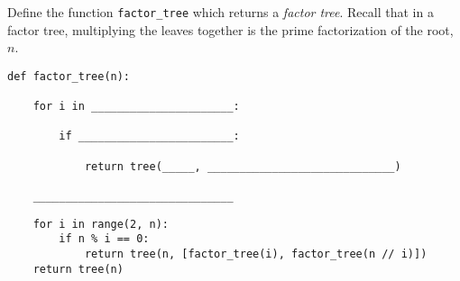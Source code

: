 \begin{blocksection}
\question Define the function \lstinline$factor_tree$ which returns a \emph{factor tree}. Recall that in a factor tree, multiplying the leaves together is the prime factorization of the root, $n$. \\

 \begin{center}
 \end{center}




\begin{lstlisting}
def factor_tree(n):

    for i in ______________________:

        if ________________________:

            return tree(_____, _____________________________)

    _______________________________
\end{lstlisting}

\begin{solution}[0.5in]
\begin{lstlisting}
    for i in range(2, n):
        if n % i == 0:
            return tree(n, [factor_tree(i), factor_tree(n // i)])
    return tree(n)
\end{lstlisting}
\end{solution}
\end{blocksection}
